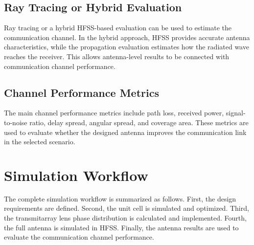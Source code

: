 \subsection{Ray Tracing or Hybrid Evaluation}
Ray tracing or a hybrid HFSS-based evaluation can be used to estimate the communication channel. In the hybrid approach, HFSS provides accurate antenna characteristics, while the propagation evaluation estimates how the radiated wave reaches the receiver. This allows antenna-level results to be connected with communication channel performance.

\subsection{Channel Performance Metrics}
The main channel performance metrics include path loss, received power, signal-to-noise ratio, delay spread, angular spread, and coverage area. These metrics are used to evaluate whether the designed antenna improves the communication link in the selected scenario.

\section{Simulation Workflow}
The complete simulation workflow is summarized as follows. First, the design requirements are defined. Second, the unit cell is simulated and optimized. Third, the transmitarray lens phase distribution is calculated and implemented. Fourth, the full antenna is simulated in HFSS. Finally, the antenna results are used to evaluate the communication channel performance.
